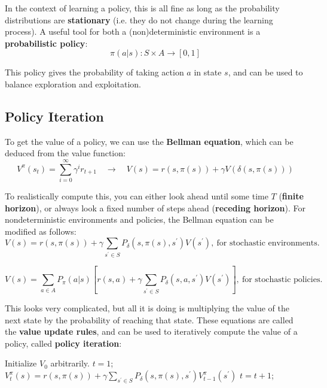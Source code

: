 \documentclass[12pt]{article}
\begin{document}
\noindent
In the context of learning a policy, this is all fine as long as the probability distributions are \textbf{stationary} (i.e. they do not change during the learning process).
A useful tool for both a (non)deterministic environment is a \textbf{probabilistic policy}:
\[ \pi(a | s): S \times A \rightarrow [0, 1] \]

\noindent
This policy gives the probability of taking action $a$ in state $s$, and can be used to balance exploration and exploitation.

\subsection{Policy Iteration}
To get the value of a policy, we can use the \textbf{Bellman equation}, which can be deduced from the value function:
\[ V^\pi(s_t) = \sum_{i = 0}^{\infty} \gamma^i r_{t + 1} \quad \rightarrow \quad V(s) = r(s, \pi(s)) + \gamma V(\delta(s, \pi(s))) \]

\noindent
To realistically compute this, you can either look ahead until some time $T$ (\textbf{finite horizon}), or always look a fixed number of steps ahead (\textbf{receding horizon}).
For nondeterministic environments and policies, the Bellman equation can be modified as follows:
\[ V(s) = r(s, \pi(s)) + \gamma \sum_{s^\prime \in S} P_\delta(s, \pi(s), s^\prime)V(s^\prime), \ \text{for stochastic environments.} \]

\[ V(s) = \sum_{a \in A} P_\pi(a | s) \left[ r(s, a) + \gamma \sum_{s^\prime \in S} P_\delta(s, a, s^\prime)V(s^\prime) \right], \ \text{for stochastic policies.} \]

\noindent
This looks very complicated, but all it is doing is multiplying the value of the next state by the probability of reaching that state.
These equations are called the \textbf{value update rules}, and can be used to iteratively compute the value of a policy, called \textbf{policy iteration}:

\begin{algorithm}
    \caption{Policy Iteration}
    \begin{algorithmic}[1]
        \State Initialize $V_0$ arbitrarily.
        \State $t = 1$;
                \State $V_t^\pi(s) = r(s, \pi(s)) + \gamma \sum_{s^\prime \in S} P_\delta(s, \pi(s), s^\prime)V_{t - 1}^\pi(s^\prime)$
            \EndFor
            \State $t = t + 1$;
        \EndWhile
    \end{algorithmic}
\end{algorithm}
\end{document}
